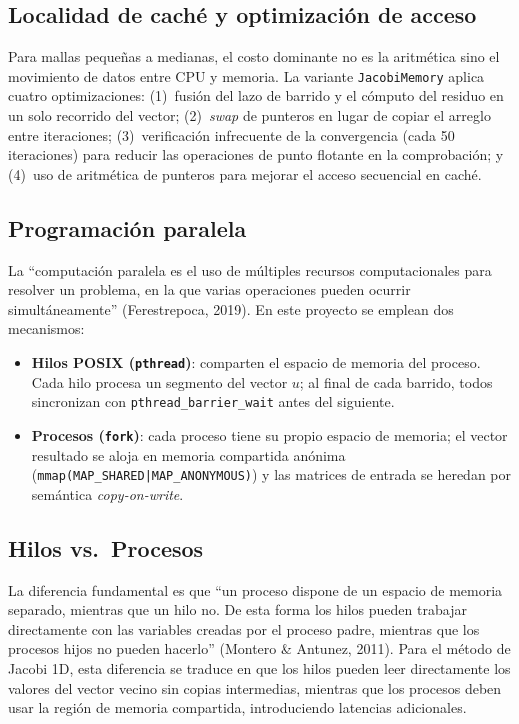 \documentclass{article}
\begin{document}
\subsection{Localidad de caché y optimización de acceso}

Para mallas pequeñas a medianas, el costo dominante no es la aritmética sino el
movimiento de datos entre CPU y memoria.  La variante \texttt{JacobiMemory}
aplica cuatro optimizaciones: (1)~fusión del lazo de barrido y el cómputo del
residuo en un solo recorrido del vector; (2)~\emph{swap} de punteros en lugar de
copiar el arreglo entre iteraciones; (3)~verificación infrecuente de la
convergencia (cada 50 iteraciones) para reducir las operaciones de punto flotante
en la comprobación; y (4)~uso de aritmética de punteros para mejorar el acceso
secuencial en caché.

\subsection{Programación paralela}

La ``computación paralela es el uso de múltiples recursos computacionales para
resolver un problema, en la que varias operaciones pueden ocurrir
simultáneamente'' (Ferestrepoca, 2019).  En este proyecto se emplean dos
mecanismos:

\begin{itemize}
  \item \textbf{Hilos POSIX (\texttt{pthread})}: comparten el espacio de memoria
    del proceso.  Cada hilo procesa un segmento del vector $u$; al final de cada
    barrido, todos sincronizan con \texttt{pthread\_barrier\_wait} antes del
    siguiente.
  \item \textbf{Procesos (\texttt{fork})}: cada proceso tiene su propio espacio
    de memoria; el vector resultado se aloja en memoria compartida anónima
    (\texttt{mmap(MAP\_SHARED|MAP\_ANONYMOUS)}) y las matrices de entrada se
    heredan por semántica \emph{copy-on-write}.
\end{itemize}

\subsection{Hilos vs.\ Procesos}

La diferencia fundamental es que ``un proceso dispone de un espacio de memoria
separado, mientras que un hilo no. De esta forma los hilos pueden trabajar
directamente con las variables creadas por el proceso padre, mientras que los
procesos hijos no pueden hacerlo'' (Montero \& Antunez, 2011).  Para el método
de Jacobi 1D, esta diferencia se traduce en que los hilos pueden leer
directamente los valores del vector vecino sin copias intermedias, mientras que
los procesos deben usar la región de memoria compartida, introduciendo latencias
adicionales.
\end{document}
